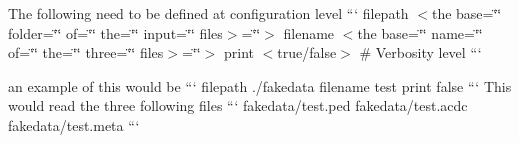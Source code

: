 The following need to be defined at configuration level ``` filepath $<$the base=\char`\"{}\char`\"{} folder=\char`\"{}\char`\"{} of=\char`\"{}\char`\"{} the=\char`\"{}\char`\"{} input=\char`\"{}\char`\"{} files$>$=\char`\"{}\char`\"{}$>$ filename $<$the base=\char`\"{}\char`\"{} name=\char`\"{}\char`\"{} of=\char`\"{}\char`\"{} the=\char`\"{}\char`\"{} three=\char`\"{}\char`\"{} files$>$=\char`\"{}\char`\"{}$>$ print $<$true/false$>$ \# Verbosity level ```

an example of this would be ``` filepath ./fakedata filename test print false ``` This would read the three following files ``` fakedata/test.\-ped fakedata/test.\-acdc fakedata/test.\-meta ``` 
